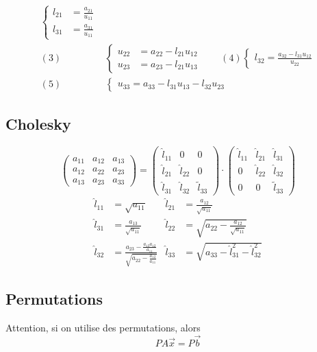 \documentclass[]{article}
\begin{document}
\begin{multicols}{3}
\begin{align*}
\begin{cases}
l_{21}&=\frac{a_{21}}{u_{11}}\\
l_{31}&=\frac{a_{31}}{u_{11}}
\end{cases}\\
(3)&\begin{cases}
u_{22}&=a_{22}-l_{21}u_{12}\\
u_{23}&=a_{23}-l_{21}u_{13}
\end{cases} \qquad(4)\begin{cases}
l_{32}=\frac{a_{32}-l_{31}u_{12}}{u_{22}}
\end{cases}\\
(5)&\begin{cases}u_{33}=a_{33}-l_{31}u_{13}-l_{32}u_{23}\end{cases}
\end{align*}
\subsection{Cholesky}
$$\begin{pmatrix}
a_{11} & a_{12} & a_{13}\\
a_{12} & a_{22} & a_{23}\\
a_{13} & a_{23} & a_{33}
\end{pmatrix}=\begin{pmatrix}
\hat{l}_{11} & 0 & 0\\
\hat{l}_{21} & \hat{l}_{22} & 0\\
\hat{l}_{31} & \hat{l}_{32} & \tilde{l}_{33}
\end{pmatrix}\cdot\begin{pmatrix}
\hat{l}_{11} & \hat{l}_{21} & \hat{l}_{31}\\
0 & \hat{l}_{22} & \hat{l}_{32}\\
0 & 0 & \tilde{l}_{33}
\end{pmatrix}$$
\begin{align*}
\hat{l}_{11}&=\sqrt{a_{11}} & \hat{l}_{21}&=\frac{a_{12}}{\sqrt{a_{11}}}\\
\hat{l}_{31}&=\frac{a_{13}}{\sqrt{a_{11}}} & \hat{l}_{22}&=\sqrt{a_{22}-\frac{a_{12}}{\sqrt{a_{11}}}}\\
\hat{l}_{32}&=\frac{a_{23}-\frac{a_{13}a_{12}}{a_{11}}}{\sqrt{a_{22}-\frac{a_{12}}{a_{11}}}} & \hat{l}_{33}&=\sqrt{a_{33}-\hat{l}_{31}^2-\hat{l}_{32}^2}
\end{align*}
\subsection{Permutations}
Attention, si on utilise des permutations, alors
$$PA\vec{x}=P\vec{b}$$

\end{multicols}
\end{document}

